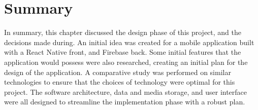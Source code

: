 \section{Summary}

In summary, this chapter discussed the design phase of this project, and the decisions made during. An initial idea was created for a mobile application built with a React Native front, and Firebase back. Some initial features that the application would possess were also researched, creating an initial plan for the design of the application. A comparative study was performed on similar technologies to ensure that the choices of technology were optimal for this project. The software architecture, data and media storage, and user interface were all designed to streamline the implementation phase with a robust plan.